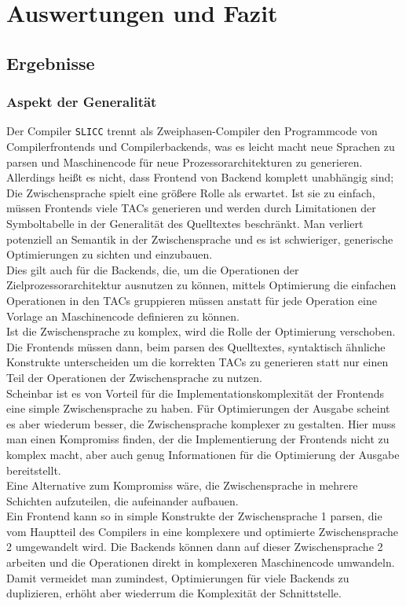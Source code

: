 \part{Auswertungen und Fazit}
\chapter{Ergebnisse}
\label{chap:fazit:results}

\section{Aspekt der Generalität}

Der Compiler \texttt{SLICC} trennt als Zweiphasen-Compiler den Programmcode von Compilerfrontends und Compilerbackends, was es leicht macht neue Sprachen zu parsen und Maschinencode für neue Prozessorarchitekturen zu generieren.\\
Allerdings heißt es nicht, dass Frontend von Backend komplett unabhängig sind; 
Die Zwischensprache spielt eine größere Rolle als erwartet.
Ist sie zu einfach, müssen Frontends viele \acp{TAC} generieren und werden durch Limitationen der Symboltabelle in der Generalität des Quelltextes beschränkt. Man verliert potenziell an Semantik in der Zwischensprache und es ist schwieriger, generische Optimierungen zu sichten und einzubauen.\\
Dies gilt auch für die Backends, die, um die Operationen der Zielprozessorarchitektur ausnutzen zu können, mittels Optimierung die einfachen Operationen in den \acp{TAC} gruppieren müssen anstatt für jede Operation eine Vorlage an Maschinencode definieren zu können.\\

Ist die Zwischensprache zu komplex, wird die Rolle der Optimierung verschoben. 
Die Frontends müssen dann, beim parsen des Quelltextes, syntaktisch ähnliche Konstrukte unterscheiden um die korrekten \acp{TAC} zu generieren statt nur einen Teil der Operationen der Zwischensprache zu nutzen.\\

Scheinbar ist es von Vorteil für die Implementationskomplexität der Frontends eine simple Zwischensprache zu haben.
Für Optimierungen der Ausgabe scheint es aber wiederum besser, die Zwischensprache komplexer zu gestalten.
Hier muss man einen Kompromiss finden, der die Implementierung der Frontends nicht zu komplex macht, aber auch genug Informationen für die Optimierung der Ausgabe bereitstellt.\\
Eine Alternative zum Kompromiss wäre, die Zwischensprache in mehrere Schichten aufzuteilen, die aufeinander aufbauen.\\
Ein Frontend kann so in simple Konstrukte der Zwischensprache 1 parsen, die vom Hauptteil des Compilers in eine komplexere und optimierte Zwischensprache 2 umgewandelt wird.
Die Backends können dann auf dieser Zwischensprache 2 arbeiten und die Operationen direkt in komplexeren Maschinencode umwandeln.\\
Damit vermeidet man zumindest, Optimierungen für viele Backends zu duplizieren, erhöht aber wiederrum die Komplexität der Schnittstelle.\\

